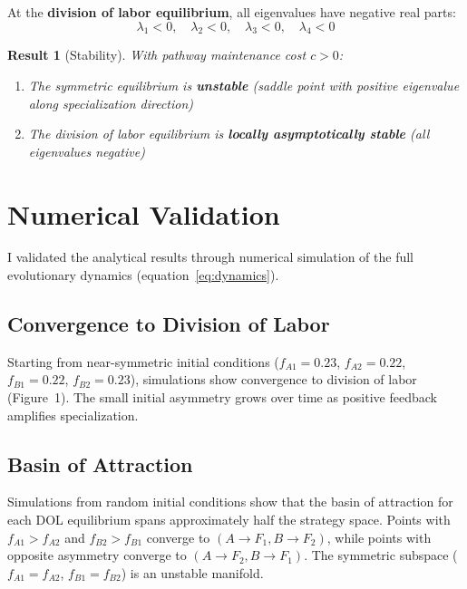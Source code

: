 \documentclass[11pt]{article}
\newtheorem{theorem}{Result}
\theoremstyle{definition}
\begin{document}
At the \textbf{division of labor equilibrium}, all eigenvalues have negative real parts:
\begin{equation}
\lambda_1 < 0, \quad \lambda_2 < 0, \quad \lambda_3 < 0, \quad \lambda_4 < 0
\end{equation}

\begin{theorem}[Stability]
With pathway maintenance cost $c > 0$:
\begin{enumerate}
\item The symmetric equilibrium is \textbf{unstable} (saddle point with positive eigenvalue along specialization direction)
\item The division of labor equilibrium is \textbf{locally asymptotically stable} (all eigenvalues negative)
\end{enumerate}
\end{theorem}

\section{Numerical Validation}

I validated the analytical results through numerical simulation of the full evolutionary dynamics (equation~\ref{eq:dynamics}).

\subsection{Convergence to Division of Labor}

Starting from near-symmetric initial conditions ($f_{A1} = 0.23$, $f_{A2} = 0.22$, $f_{B1} = 0.22$, $f_{B2} = 0.23$), simulations show convergence to division of labor (Figure~1). The small initial asymmetry grows over time as positive feedback amplifies specialization.

\subsection{Basin of Attraction}

Simulations from random initial conditions show that the basin of attraction for each DOL equilibrium spans approximately half the strategy space. Points with $f_{A1} > f_{A2}$ and $f_{B2} > f_{B1}$ converge to $(A \to F_1, B \to F_2)$, while points with opposite asymmetry converge to $(A \to F_2, B \to F_1)$. The symmetric subspace ($f_{A1} = f_{A2}$, $f_{B1} = f_{B2}$) is an unstable manifold.
\end{document}
